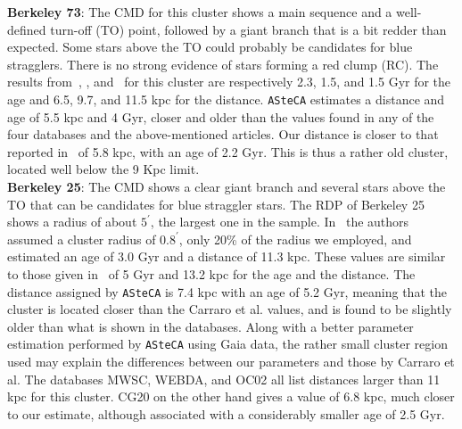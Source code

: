 \documentclass{aa}
\begin{document}
\begin{appendix}
  \noindent \textbf{Berkeley 73}: The CMD for this cluster shows a main sequence
  and a well-defined turn-off (TO) point, followed by a giant branch
  that is a bit redder than expected. Some stars above the TO could probably be
  candidates for blue stragglers. There is no strong evidence of stars forming a
  red clump (RC).
  The results from~\cite{Ortolani_2005}, \cite{Carraro_2005},
  and~\cite{Carraro_2007_oldOC} for this cluster are respectively 2.3, 1.5, and 1.5 Gyr for the age and
  6.5, 9.7, and 11.5 kpc for the  distance.
  \texttt{ASteCA} estimates a distance and age of 5.5 kpc and 4 Gyr,
  closer and older than the values found in any of the four databases and the
  above-mentioned articles. Our distance is closer to that reported
  in~\cite{Dias_2021} of 5.8 kpc, with an age of 2.2 Gyr. This is thus a
  rather old cluster, located well below the 9 Kpc limit.\\

  \noindent \textbf{Berkeley 25}: The CMD shows a clear giant branch and several stars
  above the TO that can be candidates for  blue straggler stars. The RDP of
  Berkeley 25 shows a radius of  about $5^{\prime}$, the largest one in the sample.
  In~\cite{Carraro_2005} the authors assumed a cluster radius of $0.8^{\prime}$,
  only 20\% of the radius we employed, and estimated an age of 3.0 Gyr and a
  distance of 11.3 kpc. These values are similar to those given
  in~\cite{Carraro_2007_oldOC} of 5 Gyr and 13.2 kpc for the age and the
  distance.
  The distance assigned by \texttt{ASteCA} is 7.4 kpc with an age of 5.2 Gyr,
  meaning that the cluster is located closer than the Carraro et al.
  values, and is found to be slightly older than what is shown in the
  databases.
  Along with a better parameter estimation performed by \texttt{ASteCA} using
  Gaia data, the rather small cluster region used may explain the differences
  between our parameters and those by Carraro et al. The databases MWSC,
  WEBDA, and OC02 all list distances larger than 11 kpc for this cluster. CG20
  on the other hand gives a value of 6.8 kpc, much closer to our estimate,
  although associated with a considerably smaller age of 2.5 Gyr.\\


\end{appendix}
\end{document}
